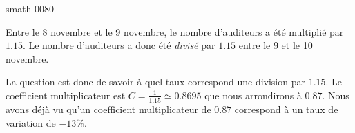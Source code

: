 
\begin{corrige}{smath-0080}

    Entre le 8 novembre et le 9 novembre, le nombre d'auditeurs a été multiplié par \( 1.15\). Le nombre d'auditeurs a donc été \emph{divisé} par \( 1.15\) entre le 9 et le 10 novembre.

    La question est donc de savoir à quel taux correspond une division par \( 1.15\). Le coefficient multiplicateur est \( C=\frac{1}{ 1.15 }\simeq 0.8695\) que nous arrondirons à \( 0.87\). Nous avons déjà vu qu'un coefficient multiplicateur de \( 0.87\) correspond à un taux de variation de \( -13\%\).

\end{corrige}
